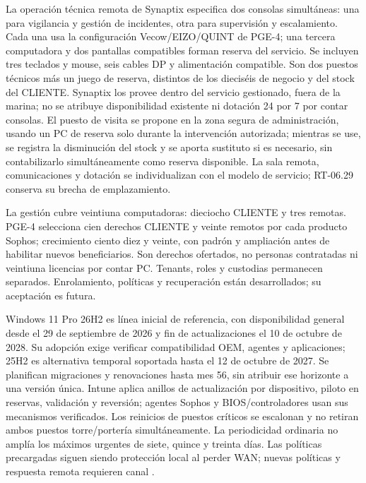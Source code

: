 La operación técnica remota de Synaptix especifica dos consolas simultáneas: una para vigilancia y gestión de incidentes, otra para supervisión y escalamiento. Cada una usa la configuración Vecow/EIZO/QUINT de PGE-4; una tercera computadora y dos pantallas compatibles forman reserva del servicio. Se incluyen tres teclados y mouse, seis cables DP y alimentación compatible. Son dos puestos técnicos más un juego de reserva, distintos de los dieciséis de negocio y del stock del CLIENTE. Synaptix los provee dentro del servicio gestionado, fuera de la marina; no se atribuye disponibilidad existente ni dotación 24 por 7 por contar consolas. El puesto de visita se propone en la zona segura de administración, usando un PC de reserva solo durante la intervención autorizada; mientras se use, se registra la disminución del stock y se aporta sustituto si es necesario, sin contabilizarlo simultáneamente como reserva disponible. La sala remota, comunicaciones y dotación se individualizan con el modelo de servicio; RT-06.29 conserva su brecha de emplazamiento.

La gestión cubre veintiuna computadoras: dieciocho CLIENTE y tres remotas. PGE-4 selecciona cien derechos CLIENTE y veinte remotos por cada producto Sophos; crecimiento ciento diez y veinte, con padrón y ampliación antes de habilitar nuevos beneficiarios. Son derechos ofertados, no personas contratadas ni veintiuna licencias por contar PC. Tenants, roles y custodias permanecen separados. Enrolamiento, políticas y recuperación están desarrollados; su aceptación es futura.

Windows 11 Pro 26H2 es línea inicial de referencia, con disponibilidad general desde el 29 de septiembre de 2026 y fin de actualizaciones el 10 de octubre de 2028. Su adopción exige verificar compatibilidad OEM, agentes y aplicaciones; 25H2 es alternativa temporal soportada hasta el 12 de octubre de 2027. Se planifican migraciones y renovaciones hasta mes 56, sin atribuir ese horizonte a una versión única. Intune aplica anillos de actualización por dispositivo, piloto en reservas, validación y reversión; agentes Sophos y BIOS/controladores usan sus mecanismos verificados. Los reinicios de puestos críticos se escalonan y no retiran ambos puestos torre/portería simultáneamente. La periodicidad ordinaria no amplía los máximos urgentes de siete, quince y treinta días. Las políticas precargadas siguen siendo protección local al perder WAN; nuevas políticas y respuesta remota requieren canal \parencites{p4-windows-versiones,p4-intune-actualizaciones}[RT-11.04, p.~23]{pucv-transversal}.

